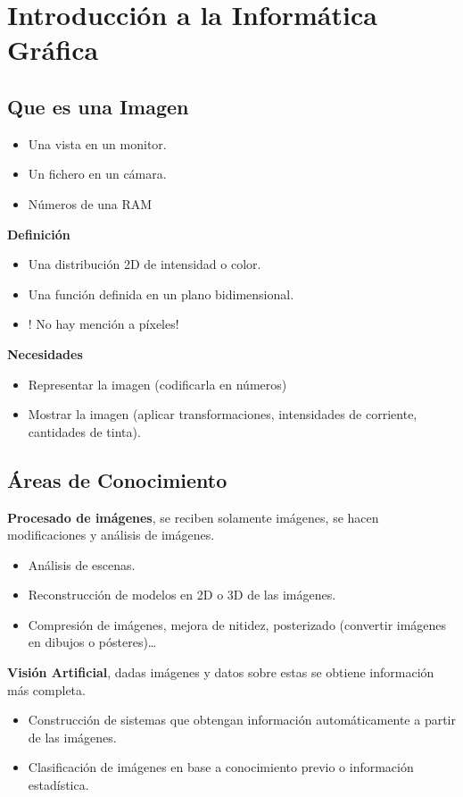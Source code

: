 \chapter{Introducción a la Informática Gráfica}\label{ch:introduccion-a-la-informática-gráfica}
\section{Que es una Imagen}\label{sec:que-es-una-imagen}
\begin{itemize}
	\item Una vista en un monitor.
	\item Un fichero en un cámara.
	\item Números de una RAM
\end{itemize}
\textbf{Definición}
\begin{itemize}
	\item Una distribución 2D de intensidad o color.
	\item Una función definida en un plano bidimensional.
	\item ! No hay mención a píxeles!
\end{itemize}
\textbf{Necesidades}
\begin{itemize}
	\item Representar la imagen (codificarla en números)
	\item Mostrar la imagen (aplicar transformaciones, intensidades de corriente, cantidades de tinta).
\end{itemize}

\section{Áreas de Conocimiento}\label{sec:áreas-de-conocimiento}
\textbf{Procesado de imágenes}, se reciben solamente imágenes, se hacen modificaciones y análisis de imágenes.
\begin{itemize}
	\item Análisis de escenas.
	\item Reconstrucción de modelos en 2D o 3D de las imágenes.
	\item Compresión de imágenes, mejora de nitidez, posterizado (convertir imágenes en dibujos o pósteres)\ldots
\end{itemize}

\textbf{Visión Artificial}, dadas imágenes y datos sobre estas se obtiene información más completa.
\begin{itemize}
	\item Construcción de sistemas que obtengan información automáticamente a partir de las imágenes.
	\item Clasificación de imágenes en base a conocimiento previo o información estadística.
\end{itemize}

